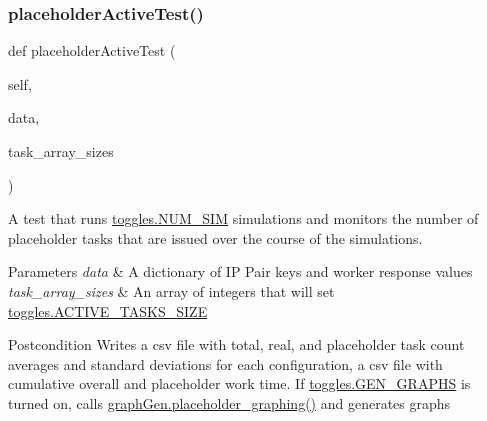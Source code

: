 \subsubsection{\texorpdfstring{placeholder\+Active\+Test()}{placeholderActiveTest()}}
{\footnotesize\ttfamily def placeholder\+Active\+Test (\begin{DoxyParamCaption}\item[{}]{self,  }\item[{}]{data,  }\item[{}]{task\+\_\+array\+\_\+sizes }\end{DoxyParamCaption})}



A test that runs \hyperlink{namespacedynamicfilterapp_1_1toggles_a3baf5565851cd87736238d8dddfc1106}{toggles.\+N\+U\+M\+\_\+\+S\+IM} simulations and monitors the number of placeholder tasks that are issued over the course of the simulations. 


\begin{DoxyParams}{Parameters}
{\em data} & A dictionary of IP Pair keys and worker response values \\
\hline
{\em task\+\_\+array\+\_\+sizes} & An array of integers that will set \hyperlink{namespacedynamicfilterapp_1_1toggles_a374727dba0574510b39c1e2871f69e48}{toggles.\+A\+C\+T\+I\+V\+E\+\_\+\+T\+A\+S\+K\+S\+\_\+\+S\+I\+ZE} \\
\hline
\end{DoxyParams}
\begin{DoxyPostcond}{Postcondition}
Writes a csv file with total, real, and placeholder task count averages and standard deviations for each configuration, a csv file with cumulative overall and placeholder work time. If \hyperlink{namespacedynamicfilterapp_1_1toggles_a57c1e3f291181d680f3ee118fa5c4ab8}{toggles.\+G\+E\+N\+\_\+\+G\+R\+A\+P\+HS} is turned on, calls \hyperlink{namespacedynamicfilterapp_1_1graph_gen_aa390916522804b2486fb15d5af94c93a}{graph\+Gen.\+placeholder\+\_\+graphing()} and generates graphs 
\end{DoxyPostcond}
\mbox{\label{classdynamicfilterapp_1_1test__simulations_1_1_simulation_test_a49b243b561aef89859a0f2676124dbc3}} 

